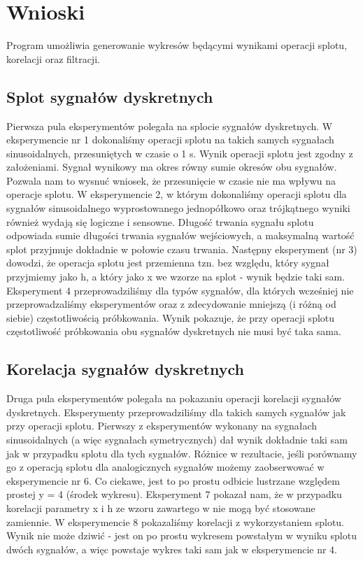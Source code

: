 \documentclass[12pt]{article}
\begin{document}

\section{Wnioski}
Program umożliwia generowanie wykresów będącymi wynikami operacji splotu, korelacji oraz filtracji.
\subsection{Splot sygnałów dyskretnych}
Pierwsza pula eksperymentów polegała na splocie sygnałów dyskretnych. W eksperymencie nr 1 dokonaliśmy operacji splotu na takich samych sygnałach sinusoidalnych, przesuniętych w czasie o 1 s. Wynik operacji splotu jest zgodny z założeniami. Sygnał wynikowy ma okres równy sumie okresów obu sygnałów. Pozwala nam to wysnuć wniosek, że przesunięcie w czasie nie ma wpływu na operacje splotu. W eksperymencie 2, w którym dokonaliśmy operacji splotu dla sygnałów sinusoidalnego wyprostowanego jednopółkowo oraz trójkątnego wyniki również wydają się logiczne i sensowne. Długość trwania sygnału splotu odpowiada sumie długości trwania sygnałów wejściowych, a maksymalną wartość splot przyjmuje dokładnie w połowie czasu trwania. Następny eksperyment (nr 3) dowodzi, że operacja splotu jest przemienna tzn. bez względu, który sygnał przyjmiemy jako h, a który jako x we wzorze na splot \cite{instrukcja} - wynik będzie taki sam. Eksperyment 4 przeprowadziliśmy dla typów sygnałów, dla których wcześniej nie przeprowadzaliśmy eksperymentów oraz z zdecydowanie mniejszą (i różną od siebie) częstotliwością próbkowania. Wynik pokazuje, że przy operacji splotu częstotliwość próbkowania obu sygnałów dyskretnych nie musi być taka sama.

\subsection{Korelacja sygnałów dyskretnych}
Druga pula eksperymentów polegała na pokazaniu operacji korelacji sygnałów dyskretnych. Eksperymenty przeprowadziliśmy dla takich samych sygnałów jak przy operacji splotu. Pierwszy z eksperymentów wykonany na sygnałach sinusoidalnych (a więc sygnałach symetrycznych) dał wynik dokładnie taki sam jak w przypadku splotu dla tych sygnałów. Różnice w rezultacie, jeśli porównamy go z operacją splotu dla analogicznych sygnałów możemy zaobserwować w eksperymencie nr 6. Co ciekawe, jest to po prostu odbicie lustrzane względem prostej y = 4 (środek wykresu). Eksperyment 7 pokazał nam, że w przypadku korelacji parametry x i h ze wzoru zawartego w \cite{instrukcja} nie mogą być stosowane zamiennie. W eksperymencie 8 pokazaliśmy korelacji z wykorzystaniem splotu. Wynik nie może dziwić - jest on po prostu wykresem powstałym w wyniku splotu dwóch sygnałów, a więc powstaje wykres taki sam jak w eksperymencie nr 4. 
\end{document}

